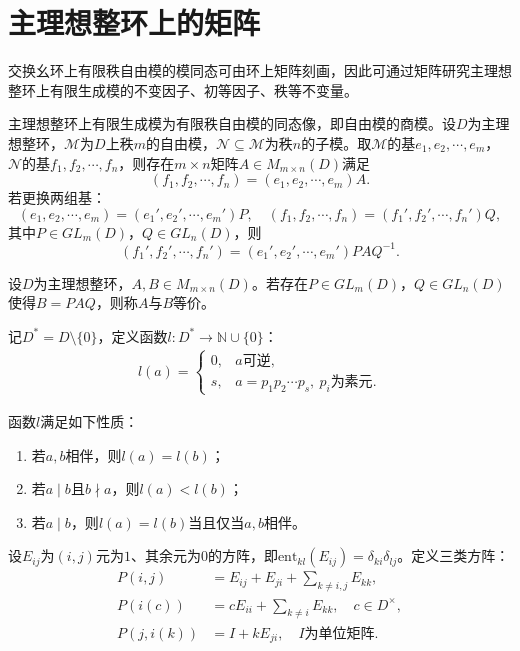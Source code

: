 \documentclass[../../main.tex]{subfiles}%
\begin{document}
\section{主理想整环上的矩阵}

交换幺环上有限秩自由模的模同态可由环上矩阵刻画，因此可通过矩阵研究主理想整环上有限生成模的不变因子、初等因子、秩等不变量。

主理想整环上有限生成模为有限秩自由模的同态像，即自由模的商模。设$D$为主理想整环，$\mathscr{M}$为$D$上秩$m$的自由模，$\mathscr{N}\subseteq\mathscr{M}$为秩$n$的子模。取$\mathscr{M}$的基$e_1,e_2,\cdots,e_m$，$\mathscr{N}$的基$f_1,f_2,\cdots,f_n$，则存在$m\times n$矩阵$A\in M_{m\times n}(D)$满足
$$(f_1,f_2,\cdots,f_n)=(e_1,e_2,\cdots,e_m)A.$$
若更换两组基：
$$(e_1,e_2,\cdots,e_m)=(e_1',e_2',\cdots,e_m')P,\quad (f_1,f_2,\cdots,f_n)=(f_1',f_2',\cdots,f_n')Q,$$
其中$P\in GL_m(D)$，$Q\in GL_n(D)$，则
$$(f_1',f_2',\cdots,f_n')=(e_1',e_2',\cdots,e_m')PAQ^{-1}.$$

\begin{definition}
设$D$为主理想整环，$A,B\in M_{m\times n}(D)$。若存在$P\in GL_m(D)$，$Q\in GL_n(D)$使得$B=PAQ$，则称$A$与$B$等价。
\end{definition}

\begin{definition}
记$D^*=D\setminus\{0\}$，定义函数$l\colon D^*\to\mathbb{N}\cup\{0\}$：
\begin{align*}
l(a)=
\begin{cases}
0,&a\text{可逆},\\
s,&a=p_1p_2\cdots p_s,\ p_i\text{为素元}.
\end{cases}
\end{align*}
\end{definition}

\begin{proposition}
函数$l$满足如下性质：
\begin{enumerate}[(1)]
\item 若$a,b$相伴，则$l(a)=l(b)$；
\item 若$a\mid b$且$b\nmid a$，则$l(a)<l(b)$；
\item 若$a\mid b$，则$l(a)=l(b)$当且仅当$a,b$相伴。
\end{enumerate}
\end{proposition}

\begin{definition}
设$E_{ij}$为$(i,j)$元为$1$、其余元为$0$的方阵，即$\mathrm{ent}_{kl}(E_{ij})=\delta_{ki}\delta_{lj}$。定义三类方阵：
\begin{align*}
P(i,j)&=E_{ij}+E_{ji}+\sum_{k\neq i,j}E_{kk},\\
P(i(c))&=cE_{ii}+\sum_{k\neq i}E_{kk},\quad c\in D^\times,\\
P(j,i(k))&=I+kE_{ji},\quad I\text{为单位矩阵}.
\end{align*}
\end{definition}
\end{document}
